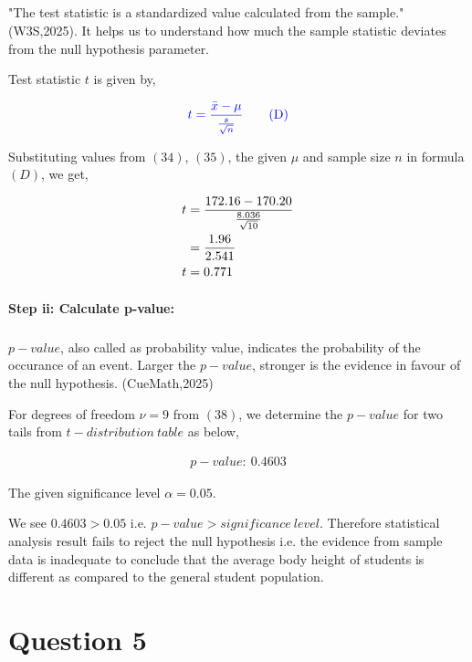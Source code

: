 \documentclass[a4paper]{report}
\begin{document}
\subparagraph*{}

"The test statistic is a standardized value calculated from the sample." (W3S,2025). It helps us to understand how much the sample statistic deviates from the null hypothesis parameter.

\newpage
Test statistic $t$ is given  by,

\begin{equation*}
    \color{blue} t=\frac{\bar{x}-\mu}{\frac{s}{\sqrt{n}}} \tag{D}
\end{equation*}

Substituting values from  $(34)$,  $(35)$, the given $\mu$ and sample size $n$ in formula $(D)$, we get,

\begin{align}
    \notag t&=\frac{172.16-170.20}{\frac{8.036}{\sqrt{10}}} \\ \notag &=\frac{1.96}{2.541} \\
    t&=0.771
\end{align}

\paragraph{Step ii: Calculate p-value:}

\subparagraph*{}


$p-value$, also called as probability value, indicates the probability of the occurance of an event. Larger the $p-value$, stronger is the evidence in favour of the null hypothesis. (CueMath,2025)


For degrees of freedom $\nu=9$ from $(38)$, we determine the $p-value$ for two tails from $t-distribution\ table$ as below,

\begin{align}
    p-value:\ 0.4603
\end{align}

The given significance level $\alpha=0.05$.

We see $0.4603 > 0.05$ i.e. $p-value>significance\ level$. 
Therefore statistical analysis result fails to reject the null hypothesis i.e. the evidence from sample data is inadequate to conclude that the average body height of students is different as compared to the general student population.



\newpage
\section*{Question 5}
\end{document}
